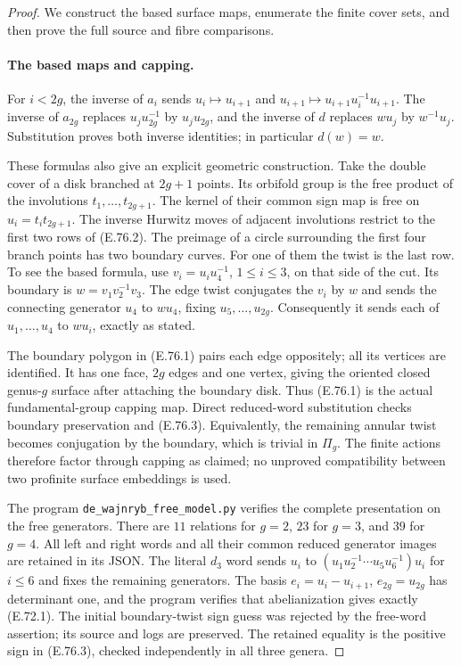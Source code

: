 \begin{proof}
We construct the based surface maps, enumerate the finite cover sets,
and then prove the full source and fibre comparisons.

\paragraph{The based maps and capping.}
For $i<2g$, the inverse of $a_i$ sends
$u_i\mapsto u_{i+1}$ and
$u_{i+1}\mapsto u_{i+1}u_i^{-1}u_{i+1}$.
The inverse of $a_{2g}$ replaces $u_j u_{2g}^{-1}$ by
$u_j u_{2g}$, and the inverse of $d$ replaces $w u_j$ by
$w^{-1}u_j$.  Substitution proves both inverse identities; in
particular $d(w)=w$.

These formulas also give an explicit geometric construction.
Take the double cover of a disk branched at $2g+1$ points.
Its orbifold group is the free product of the involutions
$t_1,\ldots,t_{2g+1}$.  The kernel of their common sign map
is free on $u_i=t_i t_{2g+1}$.  The inverse Hurwitz moves of
adjacent involutions restrict to the first two rows of
(E.76.2).  The preimage of a circle surrounding the first
four branch points has two boundary curves.  For one of
them the twist is the last row.  To see the based formula,
use $v_i=u_i u_4^{-1}$, $1\leq i\leq3$, on that side of the
cut.  Its boundary is $w=v_1v_2^{-1}v_3$.  The edge twist
conjugates the $v_i$ by $w$ and sends the connecting generator
$u_4$ to $w u_4$, fixing $u_5,\ldots,u_{2g}$.  Consequently
it sends each of $u_1,\ldots,u_4$ to $w u_i$, exactly as stated.

The boundary polygon in (E.76.1) pairs each edge oppositely;
all its vertices are identified.  It has one face, $2g$ edges
and one vertex, giving the oriented closed genus-$g$ surface
after attaching the boundary disk.  Thus (E.76.1) is the actual
fundamental-group capping map.  Direct reduced-word substitution
checks boundary preservation and (E.76.3).  Equivalently, the
remaining annular twist becomes conjugation by the boundary,
which is trivial in $\Pi_g$.  The finite actions therefore
factor through capping as claimed; no unproved compatibility
between two profinite surface embeddings is used.

The program \texttt{de\_wajnryb\_free\_model.py} verifies the
complete presentation on the free generators.  There are $11$
relations for $g=2$, $23$ for $g=3$, and $39$ for $g=4$.
All left and right words and all their common reduced generator
images are retained in its JSON.  The literal $d_3$ word sends
$u_i$ to $(u_1u_2^{-1}\cdots u_5u_6^{-1})u_i$ for $i\leq6$
and fixes the remaining generators.  The basis
$e_i=u_i-u_{i+1}$, $e_{2g}=u_{2g}$ has determinant one, and the
program verifies that abelianization gives exactly (E.72.1).
The initial boundary-twist sign guess was rejected by the
free-word assertion; its source and logs are preserved.
The retained equality is the positive sign in (E.76.3),
checked independently in all three genera.


\end{proof}
